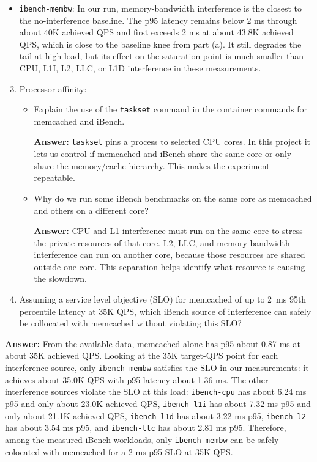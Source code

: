 \begin{itemize}
    \item \texttt{ibench-membw}: In our run, memory-bandwidth interference is the closest to the no-interference baseline. The p95 latency remains below 2 ms through about 40K achieved QPS and first exceeds 2 ms at about 43.8K achieved QPS, which is close to the baseline knee from part (a). It still degrades the tail at high load, but its effect on the saturation point is much smaller than CPU, L1I, L2, LLC, or L1D interference in these measurements.
\end{itemize}

\begin{enumerate}[label=(\alph*)]
    \setcounter{enumi}{2}
    \item Processor affinity:
    \begin{itemize}
        \item Explain the use of the \texttt{taskset} command in the container commands for memcached and iBench.

        \textbf{Answer:} \texttt{taskset} pins a process to selected CPU cores. In this project it lets us control if memcached and iBench share the same core or only share the memory/cache hierarchy. This makes the experiment repeatable.
        \\

        \item Why do we run some iBench benchmarks on the same core as memcached and others on a different core?

        \textbf{Answer:} CPU and L1 interference must run on the same core to stress the private resources of that core. L2, LLC, and memory-bandwidth interference can run on another core, because those resources are shared outside one core. This separation helps identify what resource is causing the slowdown.
    \end{itemize}
\end{enumerate}

\begin{enumerate}[label=(\alph*)]
    \setcounter{enumi}{3}
    \item Assuming a service level objective (SLO) for memcached of up to 2~ms 95th percentile latency at 35K QPS, which iBench source of interference can safely be collocated with memcached without violating this SLO?
\end{enumerate}

\textbf{Answer:} From the available data, memcached alone has p95 about 0.87 ms at about 35K achieved QPS. Looking at the 35K target-QPS point for each interference source, only \texttt{ibench-membw} satisfies the SLO in our measurements: it achieves about 35.0K QPS with p95 latency about 1.36 ms. The other interference sources violate the SLO at this load: \texttt{ibench-cpu} has about 6.24 ms p95 and only about 23.0K achieved QPS, \texttt{ibench-l1i} has about 7.32 ms p95 and only about 21.1K achieved QPS, \texttt{ibench-l1d} has about 3.22 ms p95, \texttt{ibench-l2} has about 3.54 ms p95, and \texttt{ibench-llc} has about 2.81 ms p95. Therefore, among the measured iBench workloads, only \texttt{ibench-membw} can be safely colocated with memcached for a 2 ms p95 SLO at 35K QPS.

